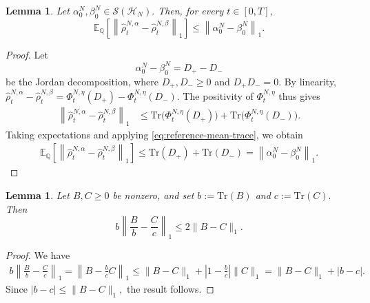 \documentclass[10pt,a4paper,reqno]{amsart}
\numberwithin{equation}{section}
\theoremstyle{plain}
\newtheorem{lemma}[theorem]{Lemma}
\theoremstyle{definition}
\theoremstyle{remark}
\newcommand{\Tr}{\mathrm{Tr}}
\newcommand{\E}{\mathbb E}
\newcommand{\Q}{\mathbb Q}
\newcommand{\cS}{\mathcal S}
\newcommand{\HH}{\mathcal H}
\newcommand{\1}{\mathbf 1}
\begin{document}
\begin{lemma}
\label{lem:linear-contraction-final}
Let
\(
  \alpha_0^N,\beta_0^N\in\cS(\HH_N).
\)
Then, for every \(t\in[0,T]\),
\begin{equation}
  \E_{\Q}
  \left[
    \left\|
      \widehat\rho_t^{N,\alpha}
      -
      \widehat\rho_t^{N,\beta}
    \right\|_1
  \right]
  \le
  \left\|
    \alpha_0^N-\beta_0^N
  \right\|_1.
  \label{eq:linear-contraction-final}
\end{equation}
\end{lemma}

\begin{proof}
Let
\[
  \alpha_0^N-\beta_0^N
  =
  D_+-D_-
\]
be the Jordan decomposition, where
\(
  D_+,D_-\ge0\) and \(
  D_+D_-=0.
\)
By linearity,
\(
  \widehat\rho_t^{N,\alpha}
  -
  \widehat\rho_t^{N,\beta}
  =
  \Phi_t^{N,\eta}(D_+)
  -
  \Phi_t^{N,\eta}(D_-).
\)
The positivity of \(\Phi_t^{N,\eta}\) thus gives
\[
\begin{aligned}
  \left\|
    \widehat\rho_t^{N,\alpha}
    -
    \widehat\rho_t^{N,\beta}
  \right\|_1
  &\le
  \Tr\bigl(\Phi_t^{N,\eta}(D_+)\bigr)
  +
  \Tr\bigl(\Phi_t^{N,\eta}(D_-)\bigr).
\end{aligned}
\]
Taking expectations and applying
\eqref{eq:reference-mean-trace}, we obtain
\[
\begin{aligned}
  \E_{\Q}
  \left[
    \left\|
      \widehat\rho_t^{N,\alpha}
      -
      \widehat\rho_t^{N,\beta}
    \right\|_1
  \right]\le
  \Tr(D_+)+\Tr(D_-)=
  \left\|
    \alpha_0^N-\beta_0^N
  \right\|_1.
\end{aligned}
\]
\end{proof}

\begin{lemma}
\label{lem:normalization-final}
Let \(B,C\ge0\) be nonzero, and set
\(
  b:=\Tr(B)\) and \(
  c:=\Tr(C).
\)
Then
\begin{equation}
  b
  \left\|
    \frac{B}{b}-\frac{C}{c}
  \right\|_1
  \le
  2\|B-C\|_1.
  \label{eq:normalization-inequality}
\end{equation}
\end{lemma}

\begin{proof}
We have
\[
\begin{aligned}
  b
  \left\|
    \frac{B}{b}-\frac{C}{c}
  \right\|_1
  =
  \left\|
    B-\frac{b}{c}C
  \right\|_1
  \le
  \|B-C\|_1
  +
  \left|
    1-\frac{b}{c}
  \right|
  \|C\|_1
  =
  \|B-C\|_1+|b-c|.
\end{aligned}
\]
Since
\(
  |b-c|
  \le
  \|B-C\|_1,
\)
the result follows.
\end{proof}
\end{document}
